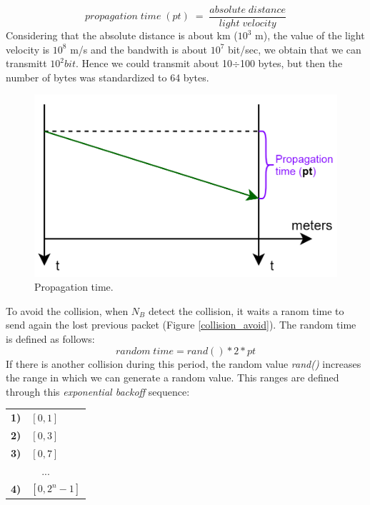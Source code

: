 $$propagation\;time\;(pt)\;=\; \frac{absolute\;distance}{light\;velocity}$$
Considering that the absolute distance is about km ($10^3$ m), the value of the light velocity is $10^8$ m/s and the bandwith is about $10^7$ bit/sec, we obtain that we can transmitt $10^2 bit$. Hence we could transmit about 10$\div$100 bytes, but then the number of bytes was standardized to 64 bytes.
\begin{figure}[H]
\centering
\includegraphics[scale=0.3]{Images/Layer2/pt}
\caption{\footnotesize{Propagation time.}}\label{pt}
\end{figure}
To avoid the collision, when $N_B$ detect the collision, it waits a ranom time to send again the lost previous packet (Figure \ref{collision_avoid}). The random time is defined as follows:
$$random\;time=rand()*2*pt$$
If there is another collision during this period, the random value \textit{rand()} increases the range in which we can generate a random value. This ranges are defined through this \textit{exponential backoff} sequence:
\begin{table}[h]
\centering \footnotesize
\begin{tabular}{rl}
\textbf{1)} & {$[0,1]$}\\
\textbf{2)} & {$[0,3]$}\\
\textbf{3)} & {$[0,7]$}\\
\multicolumn{2}{c}{...}\\
\textbf{4)} & {$[0,2^n-1]$}\\
\end{tabular}
\end{table}
